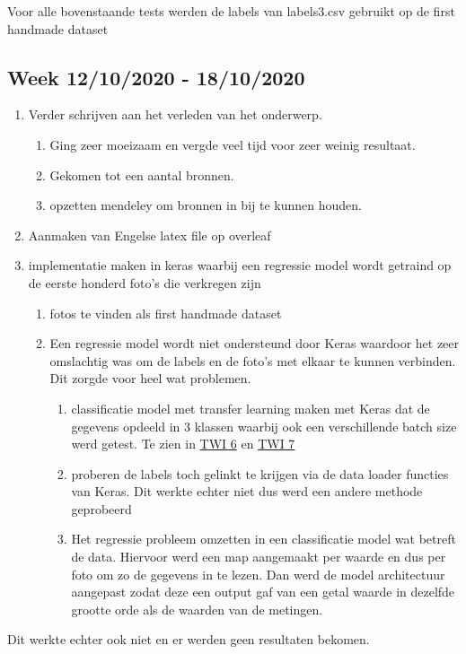 \documentclass{article}
\begin{document}
Voor alle bovenstaande tests werden de labels van labels3.csv gebruikt op de first handmade dataset





\subsection{Week 12/10/2020 - 18/10/2020}



\begin{enumerate}[1]
\item Verder schrijven aan het verleden van het onderwerp. 
	\begin{enumerate}[a]
	\item Ging zeer moeizaam en vergde veel tijd voor zeer weinig resultaat. 
	\item Gekomen tot een aantal bronnen. 
	\item opzetten mendeley om bronnen in bij te kunnen houden.
	\end{enumerate}
\item Aanmaken van Engelse latex file op overleaf
\item implementatie maken in keras waarbij een regressie model wordt getraind op de eerste honderd foto's die verkregen zijn
	\begin{enumerate}[a]
	\item fotos te vinden als first handmade dataset
	\item Een regressie model wordt niet ondersteund door Keras waardoor het zeer omslachtig was om de labels en de foto's met elkaar te kunnen verbinden. Dit zorgde voor heel wat problemen.
		\begin{enumerate}[1]
		\item classificatie model met transfer learning maken met Keras dat de gegevens opdeeld in 3 klassen waarbij ook een verschillende batch size werd getest. Te zien in \href{https://colab.research.google.com/drive/1QN68qaE84fq9dBnZFNExsS5F8tZk-8Ow}{TWI 6} en  \href{https://colab.research.google.com/drive/1zeKin3shLk_ogrFCwHrzpnjJmaWaoCq0#scrollTo=CDnGBD0NGkbM}{TWI 7}
		\item proberen de labels toch gelinkt te krijgen via de data loader functies van Keras. Dit werkte echter niet dus werd een andere methode geprobeerd
		\item Het regressie probleem omzetten in een classificatie model wat betreft de data. Hiervoor werd een map aangemaakt per waarde en dus per foto om zo de gegevens in te lezen. Dan werd de model architectuur aangepast zodat deze een output gaf van een getal waarde in dezelfde grootte orde als de waarden van de metingen. 
		\end{enumerate}
	\end{enumerate}
\end{enumerate}
			Dit werkte echter ook niet en er werden geen resultaten bekomen.
			
\end{document}
